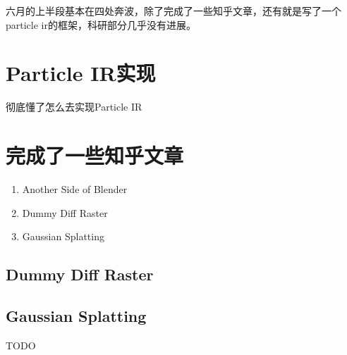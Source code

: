 六月的上半段基本在四处奔波，除了完成了一些知乎文章，还有就是写了一个particle ir的框架，科研部分几乎没有进展。

\section{Particle IR实现}

彻底懂了怎么去实现Particle IR

\section{完成了一些知乎文章}

\begin{enumerate}
    \item Another Side of Blender
    \item Dummy Diff Raster
    \item Gaussian Splatting
\end{enumerate}

\subsection{Dummy Diff Raster}


\subsection{Gaussian Splatting}
TODO